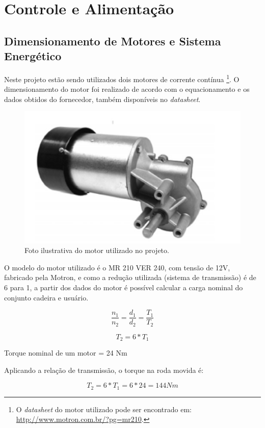 \chapter{Controle e Alimentação}

\section{Dimensionamento de Motores e Sistema Energético}

Neste projeto estão sendo utilizados dois motores de corrente contínua
\footnote{O \textit{datasheet} do motor utilizado pode ser encontrado em:
\url{http://www.motron.com.br/?pg=mr210}.}. O dimensionamento do motor foi
realizado de acordo com o equacionamento e os dados obtidos do fornecedor,
também disponíveis no \textit{datasheet}.

\begin{figure}[h!]
  \centering
  \includegraphics{figuras/Motor.jpg}
  \caption{Foto ilustrativa do motor utilizado no projeto.}
\end{figure}

O modelo do motor utilizado é o MR 210 VER 240, com tensão de 12V, fabricado
pela Motron, e como a redução utilizada (sistema de transmissão) é de 6 para 1,
a partir dos dados do motor é possível calcular a carga nominal do conjunto
cadeira e usuário.

\[\frac{n_1}{n_2} = \frac{d_1}{d_2} = \frac{T_1}{T_2}\]

\[T_2 = 6* T_1 \]

Torque nominal de um motor = 24 Nm

Aplicando a relação de transmissão, o torque na roda movida é:

\[T_2 = 6* T_1  = 6*24 = 144 Nm\]

